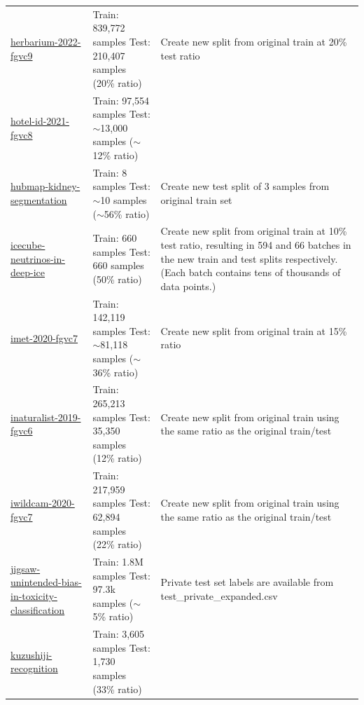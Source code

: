 \documentclass{article} %
\begin{document}
\begin{longtable}{m{4cm} m{4.5cm} m{4cm}}
    \href{https://www.kaggle.com/c/herbarium-2022-fgvc9}{herbarium-2022-fgvc9} &  Train: 839,772 samples \newline  Test: 210,407 samples (20\% ratio) & Create new split from original train at 20\% test ratio \\
    \href{https://www.kaggle.com/c/hotel-id-2021-fgvc8}{hotel-id-2021-fgvc8} &  Train: 97,554 samples \newline  Test: $\sim$13,000 samples ($\sim$12\% ratio) & \\
    \href{https://www.kaggle.com/c/hubmap-kidney-segmentation}{hubmap-kidney-segmentation} &  Train: 8 samples \newline  Test: $\sim$10 samples ($\sim$56\% ratio) & Create new test split of 3 samples from original train set \\
    \href{https://www.kaggle.com/c/icecube-neutrinos-in-deep-ice}{icecube-neutrinos-in-deep-ice} &  Train: 660 samples \newline  Test: 660 samples (50\% ratio) &  Create new split from original train at 10\% test ratio, resulting in 594 and 66 batches in the new train and test splits respectively. (Each batch contains tens of thousands of data points.)\\
    \href{https://www.kaggle.com/c/imet-2020-fgvc7}{imet-2020-fgvc7} &  Train: 142,119 samples \newline  Test: $\sim$81,118 samples ($\sim$36\% ratio) & Create new split from original train at 15\% ratio \\
    \href{https://www.kaggle.com/c/inaturalist-2019-fgvc6}{inaturalist-2019-fgvc6} &  Train: 265,213 samples \newline  Test: 35,350 samples (12\% ratio) & Create new split from original train using the same ratio as the original train/test \\
    \href{https://www.kaggle.com/c/iwildcam-2020-fgvc7}{iwildcam-2020-fgvc7} &  Train: 217,959 samples \newline  Test: 62,894 samples (22\% ratio) & Create new split from original train using the same ratio as the original train/test \\
    \href{https://www.kaggle.com/c/jigsaw-unintended-bias-in-toxicity-classification}{jigsaw-unintended-bias-in-toxicity-classification} &  Train: 1.8M samples \newline  Test: 97.3k samples ($\sim$5\% ratio) & Private test set labels are available from test\_private\_expanded.csv \\
    \href{https://www.kaggle.com/c/kuzushiji-recognition}{kuzushiji-recognition} &  Train: 3,605 samples \newline  Test: 1,730 samples (33\% ratio) & \\

\end{longtable}
\end{document}
